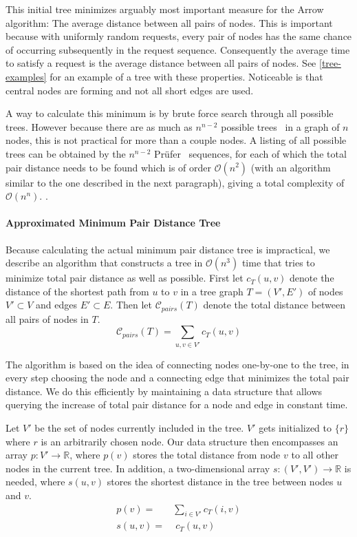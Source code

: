 \documentclass[a4paper, oneside]{discothesis}
\begin{document}
This initial tree minimizes arguably most important measure for the Arrow algorithm: The average distance between all pairs of nodes. This is important because with uniformly random requests, every pair of nodes has the same chance of occurring subsequently in the request sequence. Consequently the average time to satisfy a request is the average distance between all pairs of nodes. See \autoref{tree-examples} for an example of a tree with these properties. Noticeable is that central nodes are forming and not all short edges are used.

A way to calculate this minimum is by brute force search through all possible trees. However because there are as much as $n^{n-2}$ possible trees~\cite{Borchardt} in a graph of $n$ nodes, this is not practical for more than a couple nodes. A listing of all possible trees can be obtained by the $n^{n-2}$ Prüfer~\cite{Prufer} sequences, for each of which the total pair distance needs to be found which is of order $\mathcal{O}(n^2)$ (with an algorithm similar to the one described in the next paragraph), giving a total complexity of $\mathcal{O}(n^n)$. .


\paragraph{Approximated Minimum Pair Distance Tree}\label{tree:ampd}

Because calculating the actual minimum pair distance tree is impractical, we describe an algorithm that constructs a tree in $\mathcal{O}(n^3)$ time that tries to minimize total pair distance as well as possible. First let $c_T(u, v)$ denote the distance of the shortest path from $u$ to $v$ in a tree graph $T=(V',E')$ of nodes $V'\subset V$ and edges $E'\subset E$. Then let $\mathcal{C}_{pairs}(T)$ denote the total distance between all pairs of nodes in $T$.
\begin{equation}
\mathcal{C}_{pairs}(T) = \sum_{u,v\in V'}c_T(u,v)
\end{equation}

The algorithm is based on the idea of connecting nodes one-by-one to the tree, in every step choosing the node and a connecting edge that minimizes the total pair distance. We do this efficiently by maintaining a data structure that allows querying the increase of total pair distance for a node and edge in constant time.

Let $V'$ be the set of nodes currently included in the tree. $V'$ gets initialized to $\{r\}$ where $r$ is an arbitrarily chosen node. Our data structure then encompasses an array $p:V'\to\mathbb{R}$, where $p(v)$ stores the total distance from node $v$ to all other nodes in the current tree. In addition, a two-dimensional array $s:(V',V')\to\mathbb{R}$ is needed, where $s(u,v)$ stores the shortest distance in the tree between nodes $u$ and $v$.
\begin{equation}
\begin{split}
p(v)=&\sum_{i\in V'}c_T(i,v) \\
s(u,v)=&\;c_T(u,v)\\
\end{split}
\end{equation}
\end{document}
